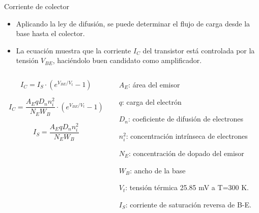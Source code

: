 \documentclass[t,aspectratio=169]{beamer}
\begin{document}
\begin{frame}{Corriente de colector}

\begin{itemize}
    \item Aplicando la ley de difusión, se puede determinar el flujo de carga desde la base hasta el colector.
    \item La ecuación muestra que la corriente $I_C$ del transistor está controlada por la tensión $V_{BE}$, haciéndolo buen candidato como amplificador.
\end{itemize}

\begin{columns}
\begin{column}{0.5\textwidth}

\[ I_C = I_S \cdot (e^{V_{BE}/V_t} - 1) \]

\[ I_C = \dfrac{A_E q D_n n_i^2}{N_E W_B} \cdot (e^{V_{BE}/V_t} - 1) \]

\[ I_S = \dfrac{A_E q D_n n_i^2}{N_E W_B} \]

\end{column}
\begin{column}{0.5\textwidth}

$A_E$: área del emisor

$q$: carga del electrón

$D_n$: coeficiente de difusión de electrones

$n_i^2$: concentración intrínseca de electrones

$N_E$: concentración de dopado del emisor

$W_B$: ancho de la base

$V_t$: tensión térmica 25.85 mV a T=300 K.

$I_S$: corriente de saturación reversa de B-E.

\end{column}
\end{columns}

\end{frame}
\end{document}
